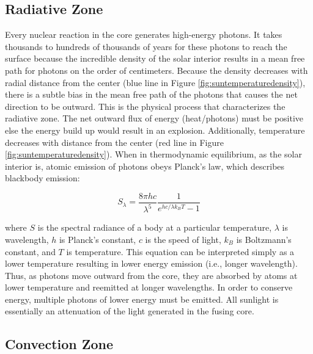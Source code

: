 \subsection{Radiative Zone}
Every nuclear reaction in the core generates high-energy photons. It takes thousands to hundreds of thousands of years for these photons to reach the surface because the incredible density of the solar interior results in a mean free path for photons on the order of centimeters. Because the density decreases with radial distance from the center (blue line in Figure \ref{fig:suntemperaturedensity}), there is a subtle bias in the mean free path of the photons that causes the net direction to be outward. This is the physical process that characterizes the radiative zone. The net outward flux of energy (heat/photons) must be positive else the energy build up would result in an explosion. Additionally, temperature decreases with distance from the center (red line in Figure \ref{fig:suntemperaturedensity}). When in thermodynamic equilibrium, as the solar interior is, atomic emission of photons obeys Planck's law, which describes blackbody emission: 

\begin{equation}
    \label{eq:planck}
    S_\lambda = \frac{8\pi hc}{\lambda^5}\frac{1}{e^{hc/\lambda k_BT} - 1}
\end{equation}

\noindent where $S$ is the spectral radiance of a body at a particular temperature, $\lambda$ is wavelength, $h$ is Planck's constant, $c$ is the speed of light, $k_B$ is Boltzmann's constant, and $T$ is temperature. This equation can be interpreted simply as a lower temperature resulting in lower energy emission (i.e., longer wavelength). Thus, as photons move outward from the core, they are absorbed by atoms at lower temperature and reemitted at longer wavelengths. In order to conserve energy, multiple photons of lower energy must be emitted. All sunlight is essentially an attenuation of the light generated in the fusing core. 

\subsection{Convection Zone}

